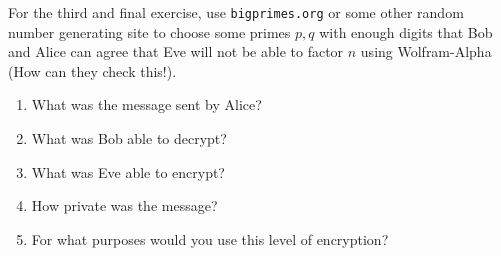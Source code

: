 \documentclass{article}
\begin{document}
    For the third and final exercise, use \verb|bigprimes.org| or some other random number generating site to choose some primes $p,q$ with enough digits that Bob and Alice can agree that Eve will not be able to factor $n$ using Wolfram-Alpha (How can they check this!). 

    \begin{enumerate}
        \item What was the message sent by Alice? 

            \TextField[width=6in,height=1in]{}

        \item What was Bob able to decrypt?

            \TextField[width=6in,height=1in]{}

        \item What was Eve able to encrypt?

            \TextField[width=6in,height=1in]{}

        \item How private was the message?

            \TextField[width=6in,height=1in]{}

        \item For what purposes would you use this level of encryption?

            \TextField[width=6in,height=1in]{}

    \end{enumerate}
\end{document}
